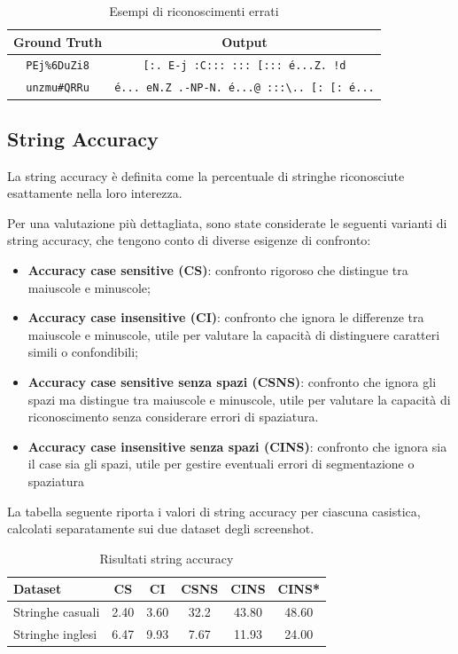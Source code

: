 \begin{table}[htbp]
    \centering
    \begin{tabular}{|c|c|}
        \hline
        \textbf{Ground Truth} & \textbf{Output} \\
        \hline
        \texttt{PEj\%6DuZi8} & \texttt{[:.\ E-j\ :C:::\ :::\ [:::\ é...Z.\ !d} \\
        \hline
        \texttt{unzmu\#QRRu} & \texttt{é...\ eN.Z\ .-NP-N.\ é...@\ :::\textbackslash..\ [:\ [:\ é...} \\
        \hline
    \end{tabular}
    \caption{Esempi di riconoscimenti errati}
    \label{tab:recognition_examples}
\end{table}

\subsection*{String Accuracy}
La string accuracy è definita come la percentuale di stringhe riconosciute esattamente nella loro interezza.

Per una valutazione più dettagliata, sono state considerate le seguenti varianti di string accuracy, che tengono conto di diverse esigenze di confronto:

\begin{itemize}
    \item \textbf{Accuracy case sensitive (CS)}: confronto rigoroso che distingue tra maiuscole e minuscole;
    \item \textbf{Accuracy case insensitive (CI)}: confronto che ignora le differenze tra maiuscole e minuscole, utile per valutare la capacità di distinguere caratteri simili o confondibili;
    \item \textbf{Accuracy case sensitive senza spazi (CSNS)}: confronto che ignora gli spazi ma distingue tra maiuscole e minuscole, utile per valutare la capacità di riconoscimento senza considerare errori di spaziatura.
    \item \textbf{Accuracy case insensitive senza spazi (CINS)}: confronto che ignora sia il case sia gli spazi, utile per gestire eventuali errori di segmentazione o spaziatura

\end{itemize}

La tabella seguente riporta i valori di string accuracy per ciascuna casistica, calcolati separatamente sui due dataset degli screenshot.

\begin{table}[htbp]
    \centering
    \begin{tabular}{lccccc}
        \toprule
        Dataset & CS & CI & CSNS & CINS & CINS* \\
        \midrule
        Stringhe casuali & 2.40 & 3.60 & 32.2 & 43.80 & 48.60 \\
        Stringhe inglesi & 6.47 & 9.93 & 7.67 & 11.93 & 24.00 \\
        \bottomrule
    \end{tabular}
    \caption{Risultati string accuracy}
    \label{tab:string_accuracy_stats}
\end{table}

